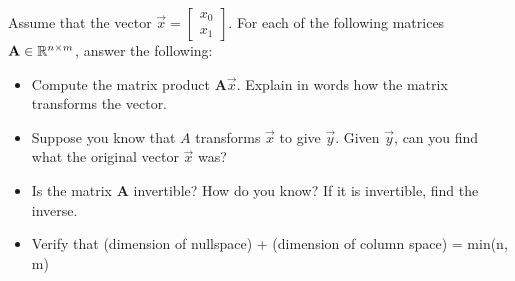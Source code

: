 


Assume that the vector $\vec{x} = \begin{bmatrix}x_0 \\ x_1\end{bmatrix}$. For each of the following matrices $\mathbf{A} \in \mathbb{R}^{n \times m}$, answer the following:
\begin{itemize}
    \item Compute the matrix product $\mathbf{A}\vec{x}$. Explain in words how the matrix transforms the vector.
    \item Suppose you know that $A$ transforms $\vec{x}$ to give $\vec{y}$. Given $\vec{y}$, can you find what the original vector $\vec{x}$ was?
    \item Is the matrix $\mathbf{A}$ invertible? How do you know? If it is invertible, find the inverse.
    \item Verify that (dimension of nullspace) + (dimension of column space) = min(n, m)
\end{itemize}
